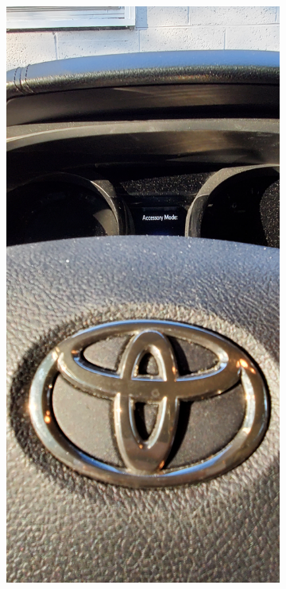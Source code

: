 \documentclass[12pt]{article}
\begin{document}
\begin{figure}[!ht]
\begin{subfigure}[b]{0.4\textwidth}
        \includegraphics[width=\textwidth]{images/car_photos/20210703_192901.jpg} %
        \caption{}
    \end{subfigure}

\end{figure}
\end{document}
